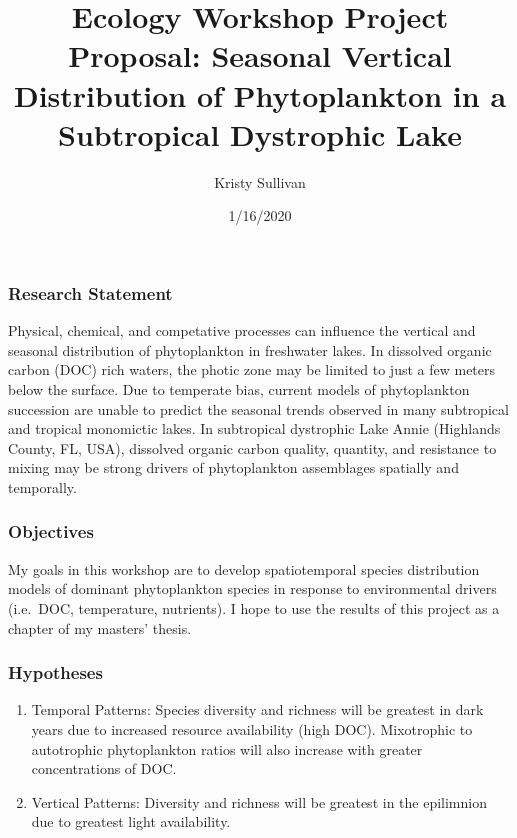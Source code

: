 \documentclass[
]{article}
\title{Ecology Workshop Project Proposal: Seasonal Vertical Distribution of
Phytoplankton in a Subtropical Dystrophic Lake}
\author{Kristy Sullivan}
\date{1/16/2020}
\providecommand{\tightlist}{%
  \setlength{\itemsep}{0pt}\setlength{\parskip}{0pt}}
\begin{document}
\maketitle

\hypertarget{research-statement}{%
\subsubsection{Research Statement}\label{research-statement}}

Physical, chemical, and competative processes can influence the vertical
and seasonal distribution of phytoplankton in freshwater lakes. In
dissolved organic carbon (DOC) rich waters, the photic zone may be
limited to just a few meters below the surface. Due to temperate bias,
current models of phytoplankton succession are unable to predict the
seasonal trends observed in many subtropical and tropical monomictic
lakes. In subtropical dystrophic Lake Annie (Highlands County, FL, USA),
dissolved organic carbon quality, quantity, and resistance to mixing may
be strong drivers of phytoplankton assemblages spatially and temporally.

\hypertarget{objectives}{%
\subsubsection{Objectives}\label{objectives}}

My goals in this workshop are to develop spatiotemporal species
distribution models of dominant phytoplankton species in response to
environmental drivers (i.e.~DOC, temperature, nutrients). I hope to use
the results of this project as a chapter of my masters' thesis.

\hypertarget{hypotheses}{%
\subsubsection{Hypotheses}\label{hypotheses}}

\begin{enumerate}
\def\labelenumi{\arabic{enumi}.}
\tightlist
\item
  Temporal Patterns: Species diversity and richness will be greatest in
  dark years due to increased resource availability (high DOC).
  Mixotrophic to autotrophic phytoplankton ratios will also increase
  with greater concentrations of DOC.
\item
  Vertical Patterns: Diversity and richness will be greatest in the
  epilimnion due to greatest light availability.
\end{enumerate}
\end{document}
